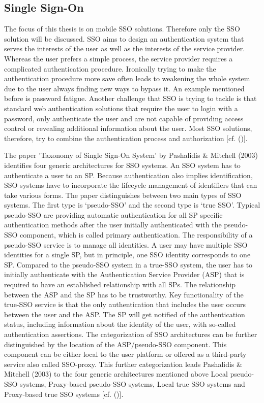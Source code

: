 {{		\subsection{Single Sign-On}	The focus of this thesis is on mobile SSO solutions. Therefore only the SSO solution will be discussed. SSO aims to design an authentication system that serves the interests of the user as well as the interests of the service provider. Whereas the user prefers a simple process, the service provider requires a complicated authentication procedure. Ironically trying to make the authentication procedure more save often leads to weakening the whole system due to the user always finding new ways to bypass it. An example mentioned before is password fatigue. Another challenge that SSO is trying to tackle is that standard web authentication solutions that require the user to login with a password, only authenticate the user and are not capable of providing access control or revealing additional information about the user. Most SSO solutions, therefore, try to combine the authentication process and authorization [cf. (\cite{Prochazka:2010:UCA})].
		
		The paper 'Taxonomy of Single Sign-On System' by Pashalidis \& Mitchell (2003) identifies four generic architectures for SSO systems. An SSO system has to authenticate a user to an SP. Because authentication also implies identification, SSO systems have to incorporate the lifecycle management of identifiers that can take various forms. The paper distinguishes between two main types of SSO systems. The first type is ‘pseudo-SSO’ and the second type is ‘true SSO’. Typical pseudo-SSO are providing automatic authentication for all SP specific authentication methods after the user initially authenticated with the pseudo-SSO component, which is called primary authentication. The responsibility of a pseudo-SSO service is to manage all identities. A user may have multiple SSO identities for a single SP, but in principle, one SSO identity corresponds to one SP. Compared to the pseudo-SSO system in a true-SSO system, the user has to initially authenticate with the Authentication Service Provider (ASP) that is required to have an established relationship with all SPs. The relationship between the ASP and the SP has to be trustworthy. Key functionality of the true-SSO service is that the only authentication that includes the user occurs between the user and the ASP. The SP will get notified of the authentication status, including information about the identity of the user, with so-called authentication assertions. The categorization of SSO architectures can be further distinguished by the location of the ASP/pseudo-SSO component. This component can be either local to the user platform or offered as a third-party service also called SSO-proxy. This further categorization leads Pashalidis \& Mitchell (2003) to the four generic architectures mentioned above Local pseudo-SSO systems, Proxy-based pseudo-SSO systems, Local true SSO systems and Proxy-based true SSO systems  [cf. (\cite{Pashalidis:2003:10.1007/3-540-45067-X_22})].
		
}}
